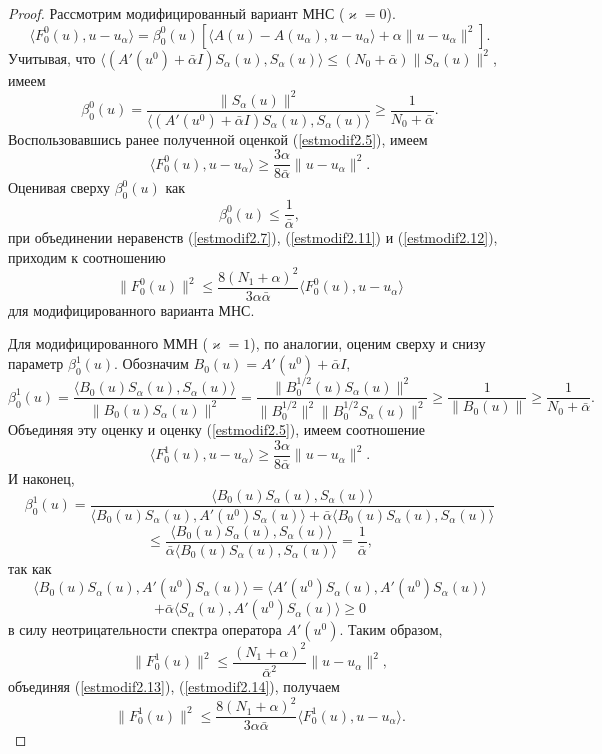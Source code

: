 \begin{proof}
Рассмотрим модифицированный вариант МНС ($\varkappa=0$).
$$\langle F_0^0(u), u-u_\alpha\rangle=\beta_0^0(u)[\langle A(u)-A(u_\alpha), u-u_\alpha\rangle+\alpha\|u-u_\alpha\|^2].$$
Учитывая, что $\langle (A'(u^0)+\bar{\alpha}I)S_\alpha(u), S_\alpha(u)\rangle\le(N_0+\bar{\alpha})\|S_\alpha(u)\|^2$, имеем
$$\beta_0^0(u)=\frac{\|S_\alpha(u)\|^2}{\langle (A'(u^0)+\bar{\alpha}I)S_\alpha(u), S_\alpha(u)\rangle}\ge\frac{1}{N_0+\bar{\alpha}}.$$
Воспользовавшись ранее полученной оценкой (\ref{estmodif2.5}), имеем
\begin{equation}\label{estmodif2.11}
\langle F_0^0(u), u-u_\alpha\rangle\ge\frac{3\alpha}{8\bar{\alpha}}\|u-u_\alpha\|^2.
\end{equation}
Оценивая сверху $\beta_0^0(u)$ как
\begin{equation}\label{estmodif2.12}
\beta_0^0(u)\le\frac{1}{\bar{\alpha}},
\end{equation}
при объединении неравенств (\ref{estmodif2.7}), (\ref{estmodif2.11}) и (\ref{estmodif2.12}), приходим к соотношению
$$\|F_0^0(u)\|^2\le\frac{8(N_1+\alpha)^2}{3\alpha\bar{\alpha}}\langle F_0^0(u), u-u_\alpha\rangle$$ для модифицированного варианта МНС.

Для модифицированного ММН ($\varkappa=1$), по аналогии, оценим сверху и снизу параметр $\beta_0^1(u)$. Обозначим $B_0(u)=A'(u^0)+\bar{\alpha}I,$
$$\beta_0^1(u)=\frac{\langle B_0(u)S_\alpha(u), S_\alpha(u)\rangle}{\|B_0(u)S_\alpha(u)\|^2}=\frac{\|B_0^{1/2}(u)S_\alpha(u)\|^2}{\|B_0^{1/2}\|^2\|B_0^{1/2}S_\alpha(u)\|^2}\ge\frac{1}{\|B_0(u)\|}\ge\frac{1}{N_0+\bar{\alpha}}.$$
Объединяя эту оценку и оценку (\ref{estmodif2.5}), имеем соотношение
\begin{equation}\label{estmodif2.13}
\langle F_0^1(u), u-u_\alpha\rangle\ge\frac{3\alpha}{8\bar{\alpha}}\|u-u_\alpha\|^2.
\end{equation}
И наконец,
$$\beta_0^1(u)=\frac{\langle B_0(u)S_\alpha(u), S_\alpha(u)\rangle}{\langle B_0(u)S_\alpha(u), A'(u^0)S_\alpha(u)\rangle+\bar{\alpha}\langle B_0(u)S_\alpha(u), S_\alpha(u)\rangle}$$
$$\le\frac{\langle B_0(u)S_\alpha(u), S_\alpha(u)\rangle}{\bar{\alpha}\langle B_0(u)S_\alpha(u), S_\alpha(u)\rangle}=\frac{1}{\bar{\alpha}},$$
так как $$\langle B_0(u)S_\alpha(u), A'(u^0)S_\alpha(u)\rangle=\langle A'(u^0)S_\alpha(u), A'(u^0)S_\alpha(u)\rangle$$$$+\bar{\alpha}\langle S_\alpha(u), A'(u^0)S_\alpha(u)\rangle\ge 0$$ в силу неотрицательности спектра оператора $A'(u^0)$. Таким образом,
\begin{equation}\label{estmodif2.14}
\|F_0^1(u)\|^2\le\frac{(N_1+\alpha)^2}{\bar{\alpha}^2}\|u-u_\alpha\|^2,
\end{equation}
объединяя (\ref{estmodif2.13}), (\ref{estmodif2.14}), получаем
$$\|F_0^1(u)\|^2\le\frac{8(N_1+\alpha)^2}{3\alpha\bar{\alpha}}\langle F_0^1(u), u-u_\alpha\rangle.$$
\end{proof}

